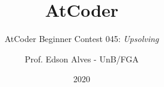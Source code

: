\title{AtCoder}
\subtitle{AtCoder Beginner Contest 045: {\it Upsolving}}
\author{Prof. Edson Alves - UnB/FGA}
\date{2020}
